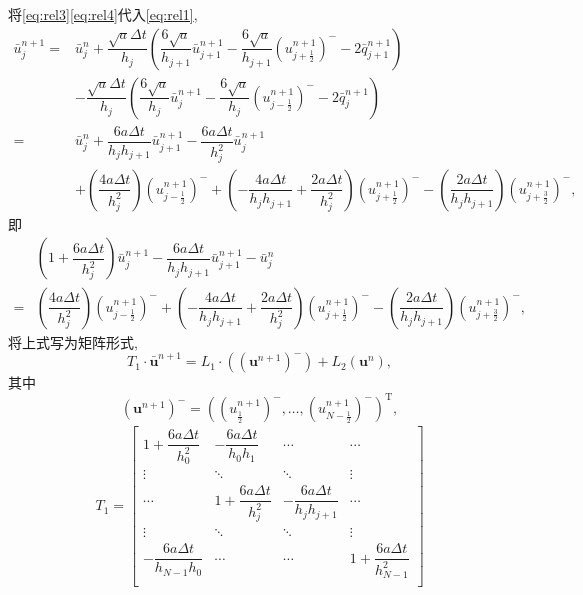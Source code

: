 \documentclass[a4paper, 11pt]{ctexart}
\numberwithin{equation}{section}
\numberwithin{figure}{section}
\newcommand\bu{\bm{u}}
\begin{document}
将\eqref{eq:rel3}\eqref{eq:rel4}代入\eqref{eq:rel1},
\begin{align}
  \bar{u}^{n+1}_j=&\bar{u}^{n}_j
  +\dfrac{\sqrt{a}\Delta t}{h_j}
  \left(\dfrac{6\sqrt{a}}{h_{j+1}}\bar{u}^{n+1}_{j+1}
    -\dfrac{6\sqrt{a}}{h_{j+1}}({u}^{n+1}_{j+\frac12})^{-}
  -2\bar{q}^{n+1}_{j+1}\right) \nonumber \\
  &-\dfrac{\sqrt{a}\Delta t}{h_j}
  \left(\dfrac{6\sqrt{a}}{h_{j}}\bar{u}^{n+1}_{j}
    -\dfrac{6\sqrt{a}}{h_{j}}({u}^{n+1}_{j-\frac12})^{-}
  -2\bar{q}^{n+1}_{j}\right) \nonumber \\
  =&\bar{u}^{n}_j+\dfrac{6a\Delta t}{h_jh_{j+1}}\bar{u}^{n+1}_{j+1}
  -\dfrac{6a\Delta t}{h_j^2}\bar{u}^{n+1}_{j} \nonumber \\
  &+\left(\dfrac{4a\Delta t}{h_j^2}\right)({u}^{n+1}_{j-\frac12})^{-}
  +\left(-\dfrac{4a\Delta t}{h_jh_{j+1}}+\dfrac{2a\Delta t}{h_j^2}\right)({u}^{n+1}_{j+\frac12})^{-}
    -\left(\dfrac{2a\Delta t}{h_jh_{j+1}}\right)({u}^{n+1}_{j+\frac32})^{-},
    \nonumber
\end{align}
即
\begin{align}
  &\left(1+\dfrac{6a\Delta t}{h_j^2}\right)\bar{u}^{n+1}_{j}
  -\dfrac{6a\Delta t}{h_jh_{j+1}}\bar{u}^{n+1}_{j+1}
-\bar{u}^{n}_j \nonumber \\
  =&\left(\dfrac{4a\Delta t}{h_j^2}\right)({u}^{n+1}_{j-\frac12})^{-}
  +\left(-\dfrac{4a\Delta t}{h_jh_{j+1}}+\dfrac{2a\Delta t}{h_j^2}\right)({u}^{n+1}_{j+\frac12})^{-}
  -\left(\dfrac{2a\Delta t}{h_jh_{j+1}}\right)({u}^{n+1}_{j+\frac32})^{-},
  \label{eq:flux-av1}
\end{align}
将上式写为矩阵形式,
\begin{equation}
  T_1\cdot\bar{\bu}^{n+1}=L_1\cdot((\bu^{n+1})^{-})+L_2(\bu^n),
  \label{eq:flux-av3}
\end{equation}
其中
\begin{equation}
  (\bu^{n+1})^{-}=((u^{n+1}_{\frac12})^{-},\dots,(u^{n+1}_{N-\frac12})^{-})^\mathrm{T},
\end{equation}
\begin{align}
  T_1=\begin{bmatrix}
    1+\dfrac{6a\Delta t}{h_0^2} & -\dfrac{6a\Delta t}{h_0h_{1}} & \cdots & \cdots \\
    \vdots & \ddots  & \ddots   & \vdots \\
    \cdots & 1+\dfrac{6a\Delta t}{h_j^2}& -\dfrac{6a\Delta t}{h_jh_{j+1}} & \cdots \\
    \vdots & \ddots  & \ddots   & \vdots \\
    -\dfrac{6a\Delta t}{h_{N-1}h_{0}} & \cdots & \cdots & 1+\dfrac{6a\Delta t}{h_{N-1}^2} \\
    \end{bmatrix}
\end{align}
\end{document}
